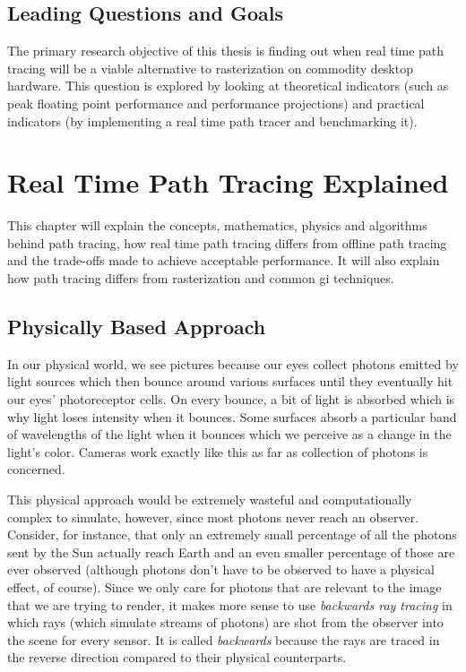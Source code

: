 \documentclass[
  twoside,
  11pt, a4paper,
  footinclude=true,
  headinclude=true,
  cleardoublepage=empty
]{scrreprt}
\begin{document}
\section{Leading Questions and Goals}
The primary research objective of this thesis is finding out when real time path tracing will be a
viable alternative to rasterization on commodity desktop hardware. This question is explored by looking at
theoretical indicators (such as peak floating point performance and performance projections)
and practical indicators (by implementing a real time path tracer and benchmarking it).

\chapter{Real Time Path Tracing Explained}
This chapter will explain the concepts, mathematics, physics and algorithms behind path tracing,
how real time path tracing differs from offline path tracing and the trade-offs made to achieve
acceptable performance. It will also explain how path tracing differs from rasterization and common
\ac{gi} techniques.

\section{Physically Based Approach}
In our physical world, we see pictures because our eyes collect photons emitted by light
sources which then bounce around various surfaces until they eventually hit our eyes'
photoreceptor cells. On every bounce, a bit of light is absorbed which is why light loses intensity
when it bounces. Some surfaces absorb a particular band of wavelengths of the light when it bounces
which we perceive as a change in the light's color. Cameras work exactly like this as far as
collection of photons is concerned.

This physical approach would be extremely wasteful and
computationally complex to simulate, however, since most photons never reach an observer. Consider,
for instance, that only an extremely small percentage of all the photons sent by the Sun actually
reach Earth and an even smaller percentage of those are ever observed (although photons
don't have to be observed to have a physical effect, of course). Since we only care for photons that
are relevant to the image that we are trying to render, it makes more sense to use
\emph{backwards ray tracing} in which rays (which simulate streams of photons) are shot from the
observer into the scene for every sensor. It is called \textit{backwards} because the rays are
traced in the reverse direction compared to their physical counterparts.
\end{document}

